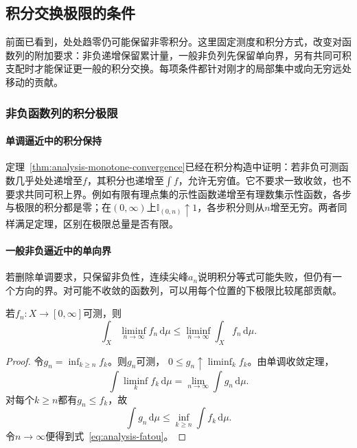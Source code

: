 \subsection{积分交换极限的条件}
\label{sec:analysis-limit-integral-interchange}

前面已看到，处处趋零仍可能保留非零积分。这里固定测度和积分方式，改变对函数列的附加要求：非负递增保留累计量，一般非负列先保留单向界，另有共同可积支配时才能保证更一般的积分交换。每项条件都针对刚才的局部集中或向无穷远处移动的贡献。

\subsubsection{非负函数列的积分极限}
\paragraph{单调逼近中的积分保持}

定理~\ref{thm:analysis-monotone-convergence}已经在积分构造中证明：若非负可测函数几乎处处递增至$f$，其积分也递增至$\int f$，允许无穷值。它不要求一致收敛，也不要求共同可积上界。例如有限有理点集的示性函数递增至有理数集示性函数，各步与极限的积分都是零；在$(0,\infty)$上$\mathbb I_{(0,n)}\uparrow1$，各步积分则从$n$增至无穷。两者同样满足定理，区别在极限总量是否有限。

\paragraph{一般非负逼近中的单向界}

若删除单调要求，只保留非负性，连续尖峰$a_n$说明积分等式可能失败，但仍有一个方向的界。对可能不收敛的函数列，可以用每个位置的下极限比较尾部贡献。

\begin{lemma}[Fatou引理]
\label{lem:analysis-fatou}
若$f_n:X\to[0,\infty]$可测，则
\begin{equation}
  \int_X\liminf_{n\to\infty}f_n\,\mathrm{d}\mu
  \leq
  \liminf_{n\to\infty}\int_Xf_n\,\mathrm{d}\mu.
\label{eq:analysis-fatou}
\end{equation}
\end{lemma}
\begin{proof}
令$g_n=\inf_{k\geq n}f_k$。则$g_n$可测， $0\leq g_n\uparrow\liminf_k f_k$。由单调收敛定理，
\[   \int\liminf_k f_k\,\mathrm{d}\mu   =   \lim_{n\to\infty}\int g_n\,\mathrm{d}\mu. \]
对每个$k\geq n$都有$g_n\leq f_k$，故
\[   \int g_n\,\mathrm{d}\mu   \leq   \inf_{k\geq n}\int f_k\,\mathrm{d}\mu. \]
令$n\to\infty$便得到式~\eqref{eq:analysis-fatou}。
\end{proof}

